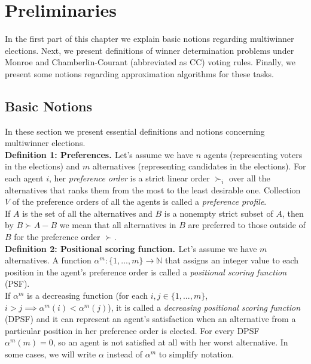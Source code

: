\chapter{Preliminaries}
\label{cha:preliminaries}

In the first part of this chapter we explain basic notions regarding multiwinner elections. Next, we present definitions of winner determination problems under Monroe and Chamberlin-Courant (abbreviated as CC) voting rules. Finally, we present some notions regarding approximation algorithms for these tasks.

\section{Basic Notions}

In these section we present essential definitions and notions concerning multiwinner elections.
\\

\noindent
\textbf{Definition 1: Preferences. \cite{1}} \hspace{.1in} Let's assume we have $n$ agents (representing voters in the elections) and $m$ alternatives (representing candidates in the elections). For each agent $i$, her \textit{preference order} is a strict linear order $\succ_{i}$ over all the alternatives that ranks them from the most to the least desirable one. Collection $V$ of the preference orders of all the agents is called a \textit{preference profile}.
\\

If $A$ is the set of all the alternatives and $B$ is a nonempty strict subset of $A$, then by $B \succ A - B$ we mean that all alternatives in $B$ are preferred to those outside of $B$ for the preference order $\succ$.
\\

\noindent
\textbf{Definition 2: Positional scoring function. \cite{1}} \hspace{.1in} Let's assume we have $m$ alternatives. A function $\alpha^{m}: \{1,...,m\} \rightarrow \mathbb{N}$ that assigns an integer value to each position in the agent's preference order is called a \textit{positional scoring function} (PSF). 
\\

If $\alpha^{m}$ is a decreasing function (for each $i, j \in \{1,...,m\}$, $i > j \implies \alpha^{m}(i) < \alpha^{m}(j)$), it is called a \textit{decreasing positional scoring function} (DPSF) and it can represent an agent's satisfaction when an alternative from a particular position in her preference order is elected. For every DPSF $\alpha^{m}(m) = 0$, so an agent is not satisfied at all with her worst alternative. In some cases, we will write $\alpha$ instead of $\alpha^{m}$ to simplify notation.
\\

